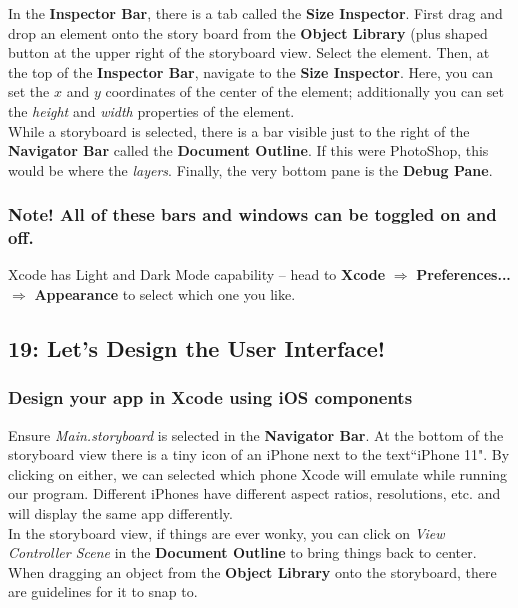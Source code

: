 \documentclass[12pt, letterpaper]{article}
\begin{document}
In the \textbf{Inspector Bar}, there is a tab called the \textbf{Size Inspector}. First drag and drop an
element onto the story board from the \textbf{Object Library} (plus shaped button at the upper
right of the storyboard view. Select the element. Then, at the top of the \textbf{Inspector Bar}, 
navigate to the \textbf{Size Inspector}. Here, you can set the $x$ and $y$ coordinates of the center
of the element; additionally you can set the \emph{height} and \emph{ width} properties 
of the element. \\

While a storyboard is selected, there is a bar visible just to the right of the \textbf{Navigator Bar} 
called the \textbf{Document Outline}. If this were PhotoShop, this would be where the \emph{layers}.
Finally, the very bottom pane is the \textbf{Debug Pane}.

\subsubsection*{Note! All of these bars and windows can be toggled on and off.}

Xcode has Light and Dark Mode capability -- head to  \textbf{Xcode} $\Rightarrow$ \textbf{Preferences...}
$\Rightarrow$ \textbf{Appearance} to select which one you like.

\subsection*{19: Let's Design the User Interface!}

\subsubsection*{Design your app in Xcode using iOS components}

Ensure \emph{Main.storyboard} is selected in the \textbf{Navigator Bar}. At the bottom of the storyboard
view there is a tiny icon of an iPhone next to the text``iPhone 11". By clicking on either, we can
selected which phone Xcode will emulate while running our program. Different iPhones have different
aspect ratios, resolutions, etc. and will display the same app differently. \\

In the storyboard view, if things are ever wonky, you can click on \emph{View Controller Scene} in the
\textbf{Document Outline} to bring things back to center. When dragging an object from the
\textbf{Object Library} onto the storyboard, there are guidelines for it to snap to. \\ 
\end{document}
